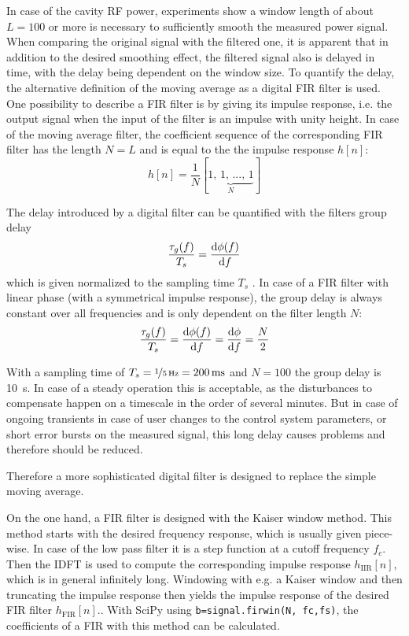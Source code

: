 In case of the cavity RF power, experiments show a window length of about $L=100$ or more is necessary to sufficiently smooth the measured power signal.
When comparing the original signal with the filtered one, it is apparent that in addition to the desired smoothing effect, the filtered signal also is delayed in time, with the delay being dependent on the window size.
To quantify the delay, the alternative definition of the moving average as a digital FIR filter is used.
One possibility to describe a FIR filter is by giving its impulse response, i.e. the output signal when the input of the filter is an impulse with unity height. In case of the moving average filter, the coefficient sequence of the corresponding FIR filter has the length $N=L$ and is equal to the the impulse response $h[n]$:
\begin{equation}
h[n] = \frac{1}{N} [\underbrace{1,\,1,\,...,\,1}_N]
\end{equation}

The delay introduced by a digital filter can be quantified with the filters group delay
\begin{equation}
\frac{\tau_g(f)}{T_s} = \frac{\text{d}{\phi(f)}}{\text{d}{f}}
\end{equation}
which is given normalized to the sampling time $T_s$ \cite[p.~70]{Kammeyer2002}. In case of a FIR filter with linear phase (with a symmetrical impulse response), the group delay is always constant over all frequencies and is only dependent on the filter length $N$\cite[p.~165]{Kammeyer2002}:
\begin{equation}\label{eq:groupD}
\frac{\tau_g(f)}{T_s} = \frac{\text{d}{\phi(f)}}{\text{d}{f}} = \frac{\text{d}{\phi}}{\text{d}{f}} = \frac{N}{2}
\end{equation}

With a sampling time of $T_s=\nicefrac{1}{\SI{5}{\hertz}}=\SI{200}{\milli\second}$ and $N=100$ the group delay is \SI{10}{\second}. In case of a steady operation this is acceptable, as the disturbances to compensate happen on a timescale in the order of several minutes.
But in case of ongoing transients in case of user changes to the control system parameters, or short error bursts on the measured signal, this long delay causes problems and therefore should be reduced.

Therefore a more sophisticated digital filter is designed to replace the simple moving average.

On the one hand, a FIR filter is designed with the Kaiser window method.
This method starts with the desired frequency response, which is usually given piece-wise. 
In case of the low pass filter it is a step function at a cutoff frequency $f_c$.
Then the IDFT is used to compute the corresponding impulse response $h_\text{IIR}[n]$, which is in general infinitely long.
Windowing with e.g. a Kaiser window and then truncating the impulse response then yields the impulse response of the desired FIR filter $h_\text{FIR}[n]$.\cite[p.~533]{Oppenheim2010}.
With SciPy using \texttt{b=signal.firwin(N, fc,fs)}, the coefficients of a FIR with this method can be calculated.

